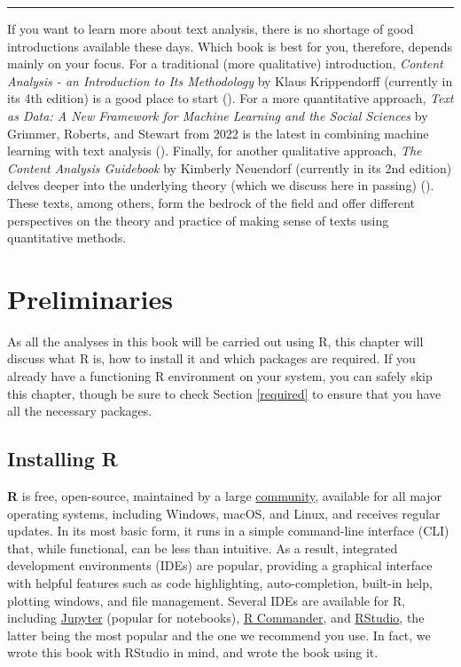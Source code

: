 \documentclass[
]{book}
\begin{document}
\begin{center}\rule{0.5\linewidth}{0.5pt}\end{center}

If you want to learn more about text analysis, there is no shortage of good introductions available these days. Which book is best for you, therefore, depends mainly on your focus. For a traditional (more qualitative) introduction, \emph{Content Analysis - an Introduction to Its Methodology} by Klaus Krippendorff (currently in its 4th edition) is a good place to start (). For a more quantitative approach, \emph{Text as Data: A New Framework for Machine Learning and the Social Sciences} by Grimmer, Roberts, and Stewart from 2022 is the latest in combining machine learning with text analysis (). Finally, for another qualitative approach, \emph{The Content Analysis Guidebook} by Kimberly Neuendorf (currently in its 2nd edition) delves deeper into the underlying theory (which we discuss here in passing) (). These texts, among others, form the bedrock of the field and offer different perspectives on the theory and practice of making sense of texts using quantitative methods.

\chapter{Preliminaries}\label{preliminaries}

As all the analyses in this book will be carried out using R, this chapter will discuss what R is, how to install it and which packages are required. If you already have a functioning R environment on your system, you can safely skip this chapter, though be sure to check Section \ref{required} to ensure that you have all the necessary packages.

\section{Installing R}\label{installing-r}

\textbf{R} is free, open-source, maintained by a large \href{https://cran.r-project.org/}{community}, available for all major operating systems, including Windows, macOS, and Linux, and receives regular updates. In its most basic form, it runs in a simple command-line interface (CLI) that, while functional, can be less than intuitive. As a result, integrated development environments (IDEs) are popular, providing a graphical interface with helpful features such as code highlighting, auto-completion, built-in help, plotting windows, and file management. Several IDEs are available for R, including \href{https://jupyter.org/}{Jupyter} (popular for notebooks), \href{https://socialsciences.mcmaster.ca/jfox/Misc/Rcmdr/}{R Commander}, and \href{https://posit.co/products/rstudio/}{RStudio}, the latter being the most popular and the one we recommend you use. In fact, we wrote this book with RStudio in mind, and wrote the book using it.
\end{document}
